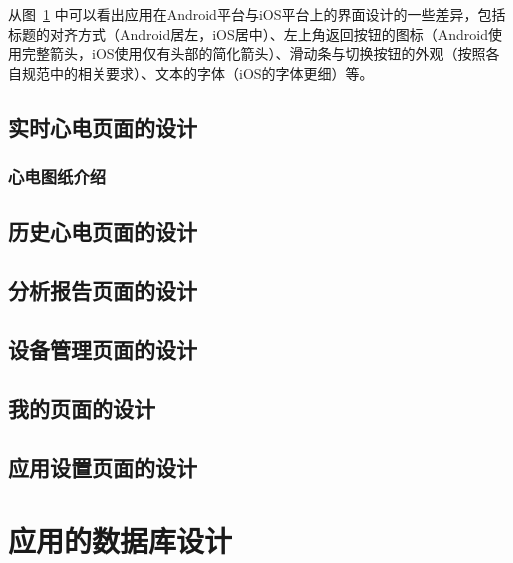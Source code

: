 \begin{figure}[h]
    \label{fig:android-ios}
\end{figure}

从图~\ref{fig:android-ios} 中可以看出应用在Android平台与iOS平台上的界面设计的一些差异，包括标题的对齐方式（Android居左，iOS居中）、左上角返回按钮的图标（Android使用完整箭头，iOS使用仅有头部的简化箭头）、滑动条与切换按钮的外观（按照各自规范中的相关要求）、文本的字体（iOS的字体更细）等。

\subsection{实时心电页面的设计}\label{subsec:real-time-design}

\subsubsection{心电图纸介绍}\label{subsubsec:ecg-paper}



\subsection{历史心电页面的设计}\label{subsec:history-design}


\subsection{分析报告页面的设计}\label{subsec:analytics-design}


\subsection{设备管理页面的设计}\label{subsec:device-design}


\subsection{我的页面的设计}\label{subsec:me-design}


\subsection{应用设置页面的设计}\label{subsec:settings-design}



\section{应用的数据库设计}\label{sec:db-design}

